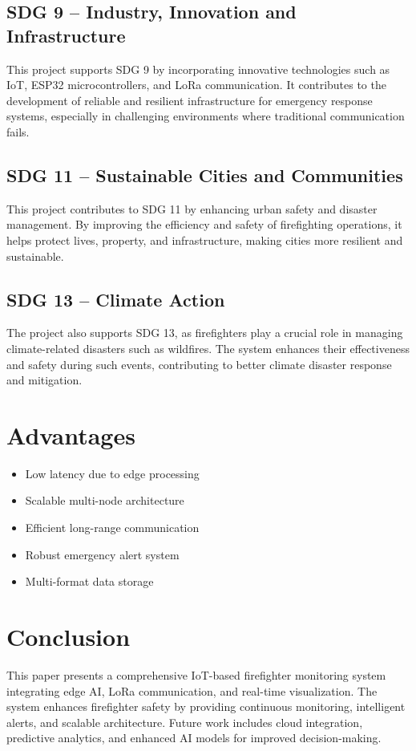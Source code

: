 \documentclass[12pt,a4paper]{article}
\begin{document}
	\subsection{SDG 9 -- Industry, Innovation and Infrastructure}
	This project supports SDG 9 by incorporating innovative technologies such as IoT, ESP32 microcontrollers, and LoRa communication. It contributes to the development of reliable and resilient infrastructure for emergency response systems, especially in challenging environments where traditional communication fails.
	
	\subsection{SDG 11 -- Sustainable Cities and Communities}
	This project contributes to SDG 11 by enhancing urban safety and disaster management. By improving the efficiency and safety of firefighting operations, it helps protect lives, property, and infrastructure, making cities more resilient and sustainable.
	
	\subsection{SDG 13 -- Climate Action}
	The project also supports SDG 13, as firefighters play a crucial role in managing climate-related disasters such as wildfires. The system enhances their effectiveness and safety during such events, contributing to better climate disaster response and mitigation.
	
	\section{Advantages}
	\begin{itemize}
		\item Low latency due to edge processing
		\item Scalable multi-node architecture
		\item Efficient long-range communication
		\item Robust emergency alert system
		\item Multi-format data storage
	\end{itemize}
	
	\section{Conclusion}
	This paper presents a comprehensive IoT-based firefighter monitoring system integrating edge AI, LoRa communication, and real-time visualization. The system enhances firefighter safety by providing continuous monitoring, intelligent alerts, and scalable architecture. Future work includes cloud integration, predictive analytics, and enhanced AI models for improved decision-making.
	
\end{document}
